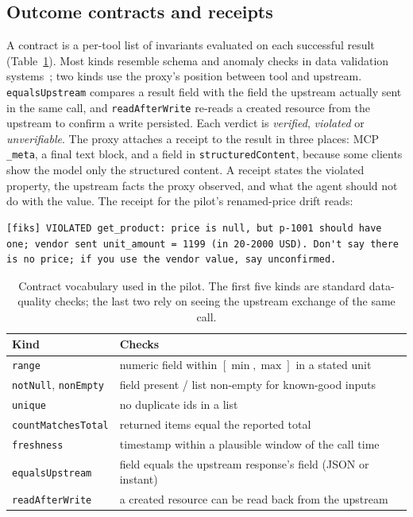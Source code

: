\documentclass[10pt]{article}
\begin{document}
\subsection{Outcome contracts and receipts}
A contract is a per-tool list of invariants evaluated on each successful result (Table~\ref{tab:vocab}).
Most kinds resemble schema and anomaly checks in data validation systems~\cite{tfdv-2019}; two kinds use the proxy's position between tool and upstream.
\texttt{equalsUpstream} compares a result field with the field the upstream actually sent in the same call, and \texttt{readAfterWrite} re-reads a created resource from the upstream to confirm a write persisted.
Each verdict is \emph{verified}, \emph{violated} or \emph{unverifiable}.
The proxy attaches a receipt to the result in three places: MCP \texttt{\_meta}, a final text block, and a field in \texttt{structuredContent}, because some clients show the model only the structured content.
A receipt states the violated property, the upstream facts the proxy observed, and what the agent should not do with the value. The receipt for the pilot's renamed-price drift reads:
\begin{lstlisting}
[fiks] VIOLATED get_product: price is null, but p-1001 should have one; vendor sent unit_amount = 1199 (in 20-2000 USD). Don't say there is no price; if you use the vendor value, say unconfirmed.
\end{lstlisting}

\begin{table}[t]
\centering\small
\caption{Contract vocabulary used in the pilot. The first five kinds are standard data-quality checks; the last two rely on seeing the upstream exchange of the same call.}
\label{tab:vocab}
\begin{tabular}{ll}
\toprule
Kind & Checks \\
\midrule
\texttt{range} & numeric field within $[\min,\max]$ in a stated unit \\
\texttt{notNull}, \texttt{nonEmpty} & field present / list non-empty for known-good inputs \\
\texttt{unique} & no duplicate ids in a list \\
\texttt{countMatchesTotal} & returned items equal the reported total \\
\texttt{freshness} & timestamp within a plausible window of the call time \\
\texttt{equalsUpstream} & field equals the upstream response's field (JSON or instant) \\
\texttt{readAfterWrite} & a created resource can be read back from the upstream \\
\bottomrule
\end{tabular}
\end{table}
\end{document}
